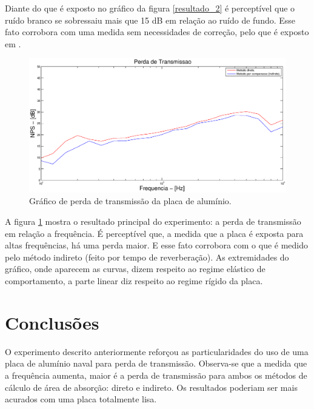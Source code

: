 Diante do que é exposto no gráfico da figura \ref{resultado_2} é perceptível que o ruído branco se sobressaiu mais que 15 dB em relação ao ruído de fundo. Esse fato corrobora com uma medida sem necessidades de correção, pelo que é exposto em \cite{silva2009simulaccao}.

\newpage
\begin{figure}[h]
\hspace{-4.5cm}
\includegraphics[scale=0.6]{codigo/perda_transmissao.eps}
\caption{Gráfico de perda de transmissão da placa de alumínio.}
\label{resultado_3}
\end{figure}

A figura \ref{resultado_3} mostra o resultado principal do experimento: a perda de transmissão em relação a frequência. É perceptível que, a medida que a placa é exposta para altas frequências, há uma perda maior. E esse fato corrobora com o que é medido pelo método indireto (feito por tempo de reverberação). As extremidades do gráfico, onde aparecem as curvas, dizem respeito ao regime elástico de comportamento, a parte linear diz respeito ao regime rígido da placa.


\chapter{Conclusões}\label{conclusoes}

O experimento descrito anteriormente reforçou as particularidades do uso de uma placa de alumínio naval para perda de transmissão. Observa-se que a medida que a frequência aumenta, maior é a perda de transmissão para ambos os métodos de cálculo de área de absorção: direto e indireto. Os resultados poderiam ser mais acurados com uma placa totalmente lisa.